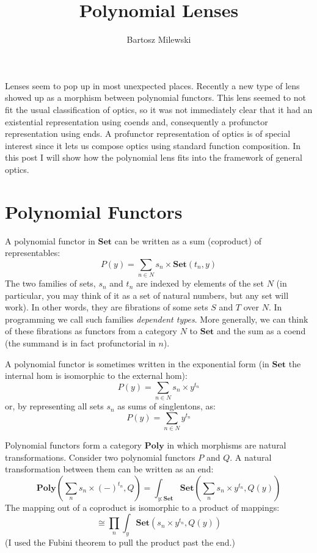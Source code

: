 \documentclass[11pt]{amsart}
\author{Bartosz Milewski}
\title{Polynomial Lenses}
\begin{document}
\maketitle{}

Lenses seem to pop up in most unexpected places. Recently a new type of lens showed up as a morphism between polynomial functors. This lens seemed to not fit the usual classification of optics, so it was not immediately clear that it had an existential representation using coends and, consequently a profunctor representation using ends. A profunctor representation of optics is of special interest since it lets us compose optics using standard function composition. In this post I will show how the polynomial lens fits into the framework of general optics.

\section{Polynomial Functors}

A polynomial functor in $\mathbf{Set}$ can be written as a sum (coproduct) of representables:
\[ P(y) = \sum_{n \in N} s_n \times \mathbf{Set}(t_n, y) \]
The two families of sets, $s_n$ and $t_n$ are indexed by elements of the set $N$ (in particular, you may think of it as a set of natural numbers, but any set will work). In other words, they are fibrations of some sets $S$ and $T$ over $N$. In programming we call such families \emph{dependent types}. More generally, we can think of these fibrations as functors from a category $N$ to $\mathbf{Set}$ and the sum as a coend (the summand is in fact profunctorial in $n$). 

A polynomial functor is sometimes written in the exponential form  (in $\mathbf{Set}$ the internal hom is isomorphic to the external hom):
\[ P(y) = \sum_{n \in N} s_n \times y^{t_n} \]
or, by representing all sets $s_n$ as sums of singlentons, as:
\[ P(y) = \sum_{n \in N} y^{t_n} \]

Polynomial functors form a category $\mathbf{Poly}$ in which morphisms are natural transformations. Consider two polynomial functors $P$ and $Q$. A natural transformation between them can be written as an end:
\[   \mathbf{Poly}\left( \sum_n s_n \times (-)^{t_n}, Q\right)  =  \int_{y\colon \mathbf{Set}} \mathbf{Set} \left(\sum_n s_n \times y^{t_n}, Q(y)\right)\]
The mapping out of a coproduct is isomorphic to a product of mappings:
\[ \cong \prod_n \int_y \mathbf{Set} \left(s_n \times y^{t_n}, Q(y)\right) \]
(I used the Fubini theorem to pull the product past the end.)
\end{document}
